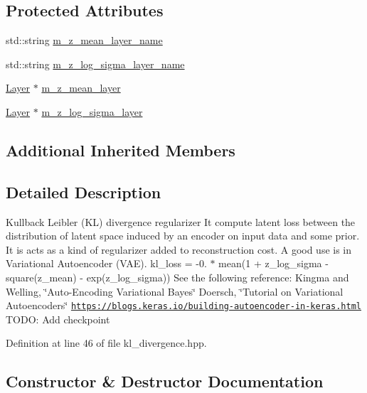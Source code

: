 \subsection*{Protected Attributes}
\begin{DoxyCompactItemize}
\item 
std\+::string \hyperlink{classlbann_1_1kl__divergence_ad9faebef778e49a01c094917bc5e72ed}{m\+\_\+z\+\_\+mean\+\_\+layer\+\_\+name}
\item 
std\+::string \hyperlink{classlbann_1_1kl__divergence_abb811a5ba98ee742838838a0137728a0}{m\+\_\+z\+\_\+log\+\_\+sigma\+\_\+layer\+\_\+name}
\item 
\hyperlink{classlbann_1_1Layer}{Layer} $\ast$ \hyperlink{classlbann_1_1kl__divergence_a7665b4f12f4e842d1850102295c21e3e}{m\+\_\+z\+\_\+mean\+\_\+layer}
\item 
\hyperlink{classlbann_1_1Layer}{Layer} $\ast$ \hyperlink{classlbann_1_1kl__divergence_aae1f6deb97728e09771840f447a571b1}{m\+\_\+z\+\_\+log\+\_\+sigma\+\_\+layer}
\end{DoxyCompactItemize}
\subsection*{Additional Inherited Members}


\subsection{Detailed Description}
Kullback Leibler (KL) divergence regularizer It compute latent loss between the distribution of latent space induced by an encoder on input data and some prior. It is acts as a kind of regularizer added to reconstruction cost. A good use is in Variational Autoencoder (V\+AE). kl\+\_\+loss = -\/0. $\ast$ mean(1 + z\+\_\+log\+\_\+sigma -\/ square(z\+\_\+mean) -\/ exp(z\+\_\+log\+\_\+sigma)) See the following reference\+: Kingma and Welling, \char`\"{}\+Auto-\/\+Encoding Variational Bayes\char`\"{} Doersch, \char`\"{}\+Tutorial on Variational Autoencoders\char`\"{} \href{https://blogs.keras.io/building-autoencoder-in-keras.html}{\tt https\+://blogs.\+keras.\+io/building-\/autoencoder-\/in-\/keras.\+html} T\+O\+DO\+: Add checkpoint 

Definition at line 46 of file kl\+\_\+divergence.\+hpp.



\subsection{Constructor \& Destructor Documentation}
\mbox{\label{classlbann_1_1kl__divergence_a3084d98e61853086a207a3893421e4d9}} 
